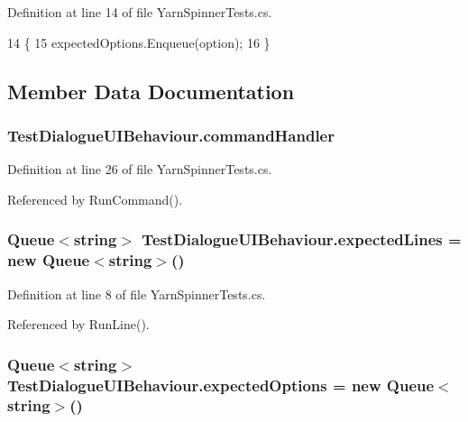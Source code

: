 Definition at line 14 of file Yarn\-Spinner\-Tests.\-cs.


\begin{DoxyCode}
14                                             \{
15         expectedOptions.Enqueue(option);
16     \}
\end{DoxyCode}


\subsection{Member Data Documentation}
\hypertarget{a00173_a5c2003ece8aeab171db3a749bef5f770}{
\subsubsection[{command\-Handler}]{ Test\-Dialogue\-U\-I\-Behaviour.\-command\-Handler}}\label{a00173_a5c2003ece8aeab171db3a749bef5f770}


Definition at line 26 of file Yarn\-Spinner\-Tests.\-cs.



Referenced by Run\-Command().

\hypertarget{a00173_ab0f7b55e776ae494a651c845b496916c}{
\subsubsection[{expected\-Lines}]{\setlength{\rightskip}{0pt plus 5cm}Queue$<$string$>$ Test\-Dialogue\-U\-I\-Behaviour.\-expected\-Lines = new Queue$<$string$>$()\hspace{0.3cm}{\ttfamily [private]}}}\label{a00173_ab0f7b55e776ae494a651c845b496916c}


Definition at line 8 of file Yarn\-Spinner\-Tests.\-cs.



Referenced by Run\-Line().

\hypertarget{a00173_a94e4308d412945c977b2deb63f139009}{
\subsubsection[{expected\-Options}]{\setlength{\rightskip}{0pt plus 5cm}Queue$<$string$>$ Test\-Dialogue\-U\-I\-Behaviour.\-expected\-Options = new Queue$<$string$>$()\hspace{0.3cm}{\ttfamily [private]}}}\label{a00173_a94e4308d412945c977b2deb63f139009}


